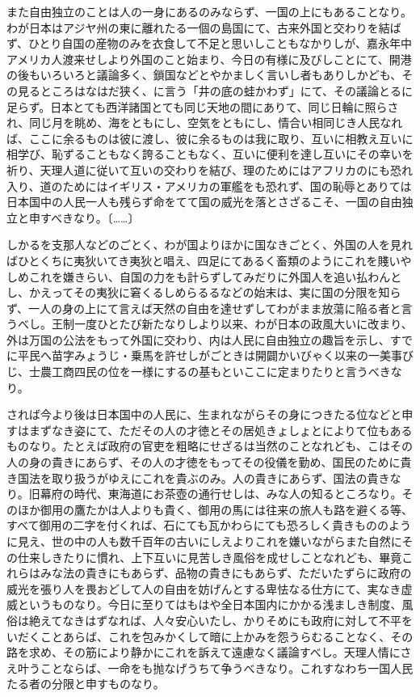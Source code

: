 また自由独立のことは人の一身にあるのみならず、一国の上にもあることなり。わが日本はアジヤ州の東に離れたる一個の島国にて、古来外国と交わりを結ばず、ひとり自国の産物のみを衣食して不足と思いしこともなかりしが、嘉永年中アメリカ人渡来せしより外国のこと始まり、今日の有様に及びしことにて、開港の後もいろいろと議論多く、鎖国などとやかましく言いし者もありしかども、その見るところはなはだ狭く、に言う「井の底の蛙かわず」にて、その議論とるに足らず。日本とても西洋諸国とても同じ天地の間にありて、同じ日輪に照らされ、同じ月を眺め、海をともにし、空気をともにし、情合い相同じき人民なれば、ここに余るものは彼に渡し、彼に余るものは我に取り、互いに相教え互いに相学び、恥ずることもなく誇ることもなく、互いに便利を達し互いにその幸いを祈り、天理人道に従いて互いの交わりを結び、理のためにはアフリカのにも恐れ入り、道のためにはイギリス・アメリカの軍艦をも恐れず、国の恥辱とありては日本国中の人民一人も残らず命をてて国の威光を落とさざるこそ、一国の自由独立と申すべきなり。〔……〕


しかるを支那人などのごとく、わが国よりほかに国なきごとく、外国の人を見ればひとくちに夷狄いてき夷狄と唱え、四足にてあるく畜類のようにこれを賤いやしめこれを嫌きらい、自国の力をも計らずしてみだりに外国人を追い払わんとし、かえってその夷狄に窘くるしめらるるなどの始末は、実に国の分限を知らず、一人の身の上にて言えば天然の自由を達せずしてわがまま放蕩に陥る者と言うべし。王制一度ひとたび新たなりしより以来、わが日本の政風大いに改まり、外は万国の公法をもって外国に交わり、内は人民に自由独立の趣旨を示し、すでに平民へ苗字みょうじ・乗馬を許せしがごときは開闢かいびゃく以来の一美事びじ、士農工商四民の位を一様にするの基もといここに定まりたりと言うべきなり。

されば今より後は日本国中の人民に、生まれながらその身につきたる位などと申すはまずなき姿にて、ただその人の才徳とその居処きょしょとによりて位もあるものなり。たとえば政府の官吏を粗略にせざるは当然のことなれども、こはその人の身の貴きにあらず、その人の才徳をもってその役儀を勤め、国民のために貴き国法を取り扱うがゆえにこれを貴ぶのみ。人の貴きにあらず、国法の貴きなり。旧幕府の時代、東海道にお茶壺の通行せしは、みな人の知るところなり。そのほか御用の鷹たかは人よりも貴く、御用の馬には往来の旅人も路を避くる等、すべて御用の二字を付くれば、石にても瓦かわらにても恐ろしく貴きもののように見え、世の中の人も数千百年の古いにしえよりこれを嫌いながらまた自然にその仕来しきたりに慣れ、上下互いに見苦しき風俗を成せしことなれども、畢竟これらはみな法の貴きにもあらず、品物の貴きにもあらず、ただいたずらに政府の威光を張り人を畏おどして人の自由を妨げんとする卑怯なる仕方にて、実なき虚威というものなり。今日に至りてはもはや全日本国内にかかる浅ましき制度、風俗は絶えてなきはずなれば、人々安心いたし、かりそめにも政府に対して不平をいだくことあらば、これを包みかくして暗に上かみを怨うらむることなく、その路を求め、その筋により静かにこれを訴えて遠慮なく議論すべし。天理人情にさえ叶うことならば、一命をも抛なげうちて争うべきなり。これすなわち一国人民たる者の分限と申すものなり。

